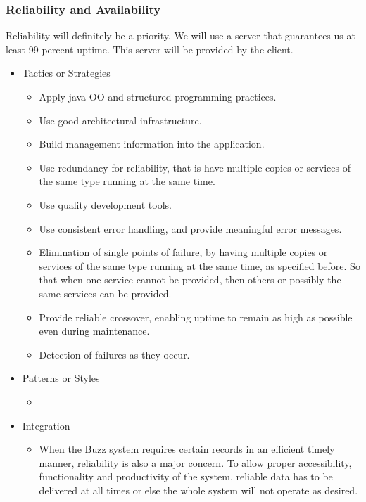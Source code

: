 \subsubsection{Reliability and Availability}
		Reliability will definitely be a priority. We will use a server that guarantees us at least 99 percent uptime. This server will be provided by the client.
		\begin{itemize}
	\item{Tactics or Strategies}
		\begin{itemize}
			\item Apply java OO and structured programming practices.
			\item Use good architectural infrastructure.
			\item Build management information into the application.
			\item Use redundancy for reliability, that is have multiple copies or services of the same type running at the same time.
			\item Use quality development tools.
			\item Use consistent error handling, and provide meaningful error messages.
			\item Elimination of single points of failure, by having multiple copies or services of the same type running at the same time, as specified before. So that when one service cannot be provided, then others or possibly the same services can be provided.
			\item Provide reliable crossover, enabling uptime to remain as high as possible even during maintenance.
			\item Detection of failures as they occur.
		\end{itemize}
	\item{Patterns or Styles}
		\begin{itemize}
			\item
		\end{itemize}
	\item{Integration}
		\begin{itemize}
			\item When the Buzz system requires certain records in an efficient timely manner, reliability is also a major concern. To allow proper accessibility, functionality and productivity of the system, reliable data has to be delivered at all times or else the whole system will not operate as desired.
		\end{itemize}
\end{itemize}
		
